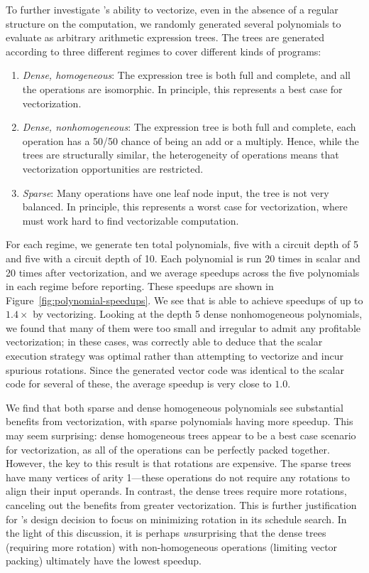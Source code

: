 To further investigate \system's ability to vectorize, even in the absence of a regular structure on the computation, we randomly generated several polynomials to evaluate as arbitrary arithmetic expression trees.
The trees are generated according to three different regimes to cover different kinds of programs: 
\begin{enumerate}
    \item {\em Dense, homogeneous}: The expression tree is both full and complete, and all the operations are isomorphic. In principle, this represents a best case for vectorization.
    \item {\em Dense, nonhomogeneous}: The expression tree is both full and complete, each operation has a 50/50 chance of being an add or a multiply. Hence, while the trees are structurally similar, the heterogeneity of operations means that vectorization opportunities are restricted.
	\item {\em Sparse}: Many operations have one leaf node input, the tree is not very balanced. In principle, this represents a worst case for vectorization, where \system must work hard to find vectorizable computation.
\end{enumerate}
For each regime, we generate ten total polynomials, five with a circuit depth of 5 and five with a circuit depth of 10.
Each polynomial is run 20 times in scalar and 20 times after vectorization, and we average speedups across the five polynomials in each regime before reporting.
These speedups are shown in Figure~\ref{fig:polynomial-speedups}.
We see that \system is able to achieve speedups of up to $1.4\times$ by vectorizing.
Looking at the depth 5 dense nonhomogeneous polynomials, we found that many of them were too small and irregular to admit any profitable vectorization; in these cases, \system was correctly able to deduce that the scalar execution strategy was optimal rather than attempting to vectorize and incur spurious rotations.
Since the generated vector code was identical to the scalar code for several of these, the average speedup is very close to $1.0$.

We find that both sparse and dense homogeneous polynomials see substantial benefits from vectorization, with sparse polynomials having more speedup. This may seem surprising: dense homogeneous trees appear to be a best case scenario for vectorization, as all of the operations can be perfectly packed together. However, the key to this result is that rotations are expensive. The sparse trees have many vertices of arity 1---these operations do not require any rotations to align their input operands. In contrast, the dense trees require more rotations, canceling out the benefits from greater vectorization. This is further justification for \system's design decision to focus on minimizing rotation in its schedule search. In the light of this discussion, it is perhaps {\em un}surprising that the dense trees (requiring more rotation) with non-homogeneous operations (limiting vector packing) ultimately have the lowest speedup.

